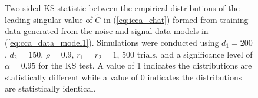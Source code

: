 \begin{figure}
  \caption{Two-sided KS statistic between the empirical distributions of the leading
    singular value of $\widetilde{C}$ in (\ref{eq:icca_chat}) formed from training data
    generated from the noise and signal data models in
    (\ref{eq:cca_data_model1}). Simulations were conducted using $d_1=200$, $d_2=150$,
    $\rho=0.9$, $r_1=r_2=1$, 500 trials, and a significance level of $\alpha=0.95$ for the
    KS test. A value of 1 indicates the distributions are statistically different while a
    value of 0 indicates the distributions are statistically identical.}
  \label{fig:icca_ks_heatmap}
\end{figure}

